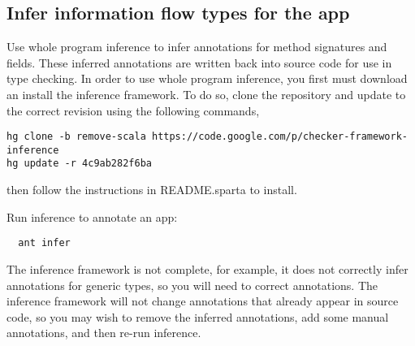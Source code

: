 %
%
%
%
%
%
%
%

\subsection{Infer information flow types for the app\label{flow-task-annotate-app}}
Use whole program inference to infer annotations for method signatures and fields.  
These inferred 
annotations are written back into source code for use in type checking.  In order to use whole program
inference, you first must download an install the inference framework.  To do so, clone the repository 
and update to the correct revision using the following commands,
\begin{Verbatim}
hg clone -b remove-scala https://code.google.com/p/checker-framework-inference
hg update -r 4c9ab282f6ba 
\end{Verbatim}
\noindent
then follow the instructions in README.sparta to install.

Run inference to annotate an app:

\begin{Verbatim}
  ant infer
\end{Verbatim}

The inference framework is not complete, for example, it does not correctly infer annotations 
for generic types, so you will need to correct annotations.  The inference framework will
not change annotations that already appear in source code, so you may wish to remove the inferred 
annotations, add some manual annotations, and then re-run inference. 

